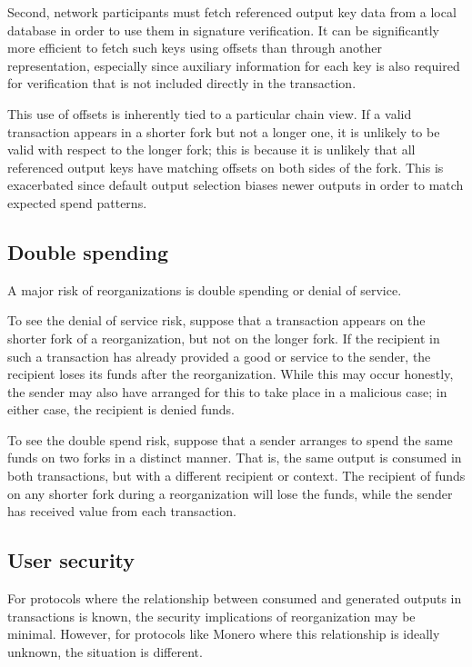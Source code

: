 \documentclass{article}
\theoremstyle{definition}
\begin{document}
Second, network participants must fetch referenced output key data from a local database in order to use them in signature verification.
It can be significantly more efficient to fetch such keys using offsets than through another representation, especially since auxiliary information for each key is also required for verification that is not included directly in the transaction.

This use of offsets is inherently tied to a particular chain view.
If a valid transaction appears in a shorter fork but not a longer one, it is unlikely to be valid with respect to the longer fork; this is because it is unlikely that all referenced output keys have matching offsets on both sides of the fork.
This is exacerbated since default output selection biases newer outputs in order to match expected spend patterns.


\subsection{Double spending}

A major risk of reorganizations is double spending or denial of service.

To see the denial of service risk, suppose that a transaction appears on the shorter fork of a reorganization, but not on the longer fork.
If the recipient in such a transaction has already provided a good or service to the sender, the recipient loses its funds after the reorganization.
While this may occur honestly, the sender may also have arranged for this to take place in a malicious case; in either case, the recipient is denied funds.

To see the double spend risk, suppose that a sender arranges to spend the same funds on two forks in a distinct manner.
That is, the same output is consumed in both transactions, but with a different recipient or context.
The recipient of funds on any shorter fork during a reorganization will lose the funds, while the sender has received value from each transaction.



\subsection{User security}

For protocols where the relationship between consumed and generated outputs in transactions is known, the security implications of reorganization may be minimal.
However, for protocols like Monero where this relationship is ideally unknown, the situation is different.
\end{document}
